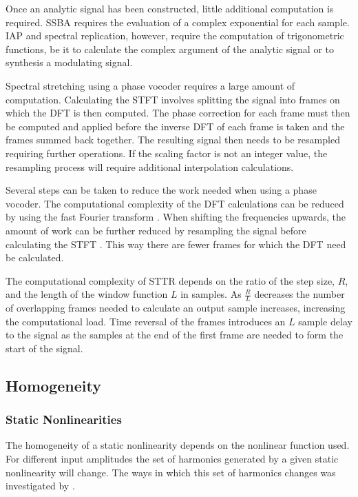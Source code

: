 		Once an analytic signal has been constructed, little additional computation is required. SSBA requires the
		evaluation of a complex exponential for each sample. IAP and spectral replication, however, require the
		computation of trigonometric functions, be it to calculate the complex argument of the analytic signal or to
		synthesis a modulating signal.

		Spectral stretching using a phase vocoder requires a large amount of computation. Calculating the STFT
		involves splitting the signal into frames on which the DFT is then computed. The phase correction for each
		frame must then be computed and applied before the inverse DFT of each frame is taken and the frames summed
		back together. The resulting signal then needs to be resampled requiring further operations. If the scaling
		factor is not an integer value, the resampling process will require additional interpolation calculations.
	
		Several steps can be taken to reduce the work needed when using a phase vocoder. The computational
		complexity of the DFT calculations can be reduced by using the fast Fourier transform
		\citep{portnoff1976implementation}. When shifting the frequencies upwards, the amount of work can be further
		reduced by resampling the signal before calculating the STFT \citep{laroche1999new}. This way there are
		fewer frames for which the DFT need be calculated.

		The computational complexity of STTR depends on the ratio of the step size, $R$, and the length of the
		window function $L$ in samples. As $\frac{R}{L}$ decreases the number of overlapping frames needed to
		calculate an output sample increases, increasing the computational load. Time reversal of the frames
		introduces an $L$ sample delay to the signal as the samples at the end of the first frame are needed to form
		the start of the signal.

	\subsection{Homogeneity}
	\label{sec:ExcitationEvaluation-Comparison-Homogeneity}

		\subsubsection*{Static Nonlinearities}
			The homogeneity of a static nonlinearity depends on the nonlinear function used. For different
			input amplitudes the set of harmonics generated by a given static nonlinearity will change. The
			ways in which this set of harmonics changes was investigated by \citet{enderby2012harmonic}.

